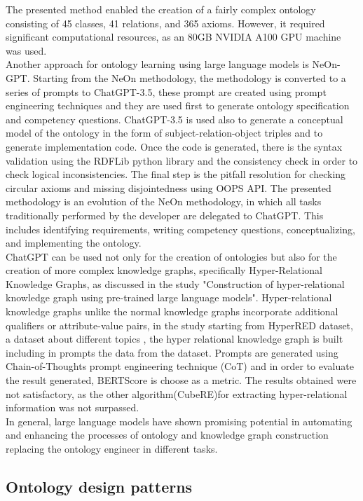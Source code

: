 The presented method enabled the creation of a fairly complex ontology consisting of 45 classes, 41 relations, and 365 axioms. However, it required significant computational resources, as an 80GB NVIDIA A100 GPU machine was used. \\
Another approach for ontology learning using large language models is NeOn-GPT.\cite{fathallah2024neon} Starting from the NeOn methodology, the methodology is converted to a series of prompts to ChatGPT-3.5, these prompt are created using prompt engineering techniques and they are used first to generate ontology specification and competency questions. ChatGPT-3.5 is used also to generate a conceptual model of the ontology in the form of subject-relation-object triples and to generate implementation code. Once the code is generated, there is the syntax validation using the RDFLib python library\cite{rdflib} and the consistency check in order to check logical inconsistencies. The final step is the pitfall resolution for checking circular axioms and missing disjointedness using OOPS API. The presented methodology is an evolution of the NeOn methodology, in which all tasks traditionally performed by the developer are delegated to ChatGPT. This includes identifying requirements, writing competency questions, conceptualizing, and implementing the ontology.\\
ChatGPT can be used not only for the creation of ontologies but also for the creation of more complex knowledge graphs, specifically Hyper-Relational Knowledge Graphs, as discussed in the study "Construction of hyper-relational knowledge graph using pre-trained large language models".\cite{datta2024construction} Hyper-relational knowledge graphs unlike the normal knowledge graphs incorporate additional qualifiers or attribute-value pairs\cite{hyper}, in the study starting from HyperRED dataset, a dataset about different topics , the hyper relational knowledge graph is built including in prompts the data from the dataset. Prompts are generated using Chain-of-Thoughts prompt engineering technique (CoT) and in order to evaluate the result generated, BERTScore is choose as a metric. The results obtained were not satisfactory, as the other algorithm(CubeRE)for extracting hyper-relational information was not surpassed.\\
In general, large language models have shown promising potential  in automating and enhancing the processes of ontology and knowledge graph construction replacing the ontology engineer in different tasks.

\subsection{Ontology design patterns}

